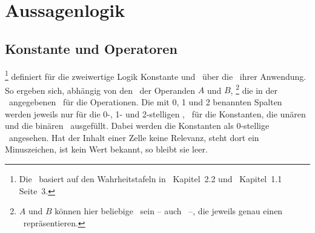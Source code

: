 \section{Aussagenlogik}%
\label{sec:Aussagenlogik}

\subsection{Konstante und Operatoren}%
\label{sub:Operatoren}

%
\footnote{%
	Die \tablename\ basiert auf den Wahrheitstafeln in~\cite{bib:Junktor} Kapitel~2.2 und~\cite{bib:Rautenberg} Kapitel~1.1 Seite~3.
}
definiert für die zweiwertige Logik Konstante und \Junktoren\ über die \Wahrheitswerte\ ihrer Anwendung.
So ergeben sich, abhängig von den \Wahrheitswerten\ der Operanden $A$ und $B$,%
\footnote{%
	$A$ und $B$ können hier beliebige \Aussagen\ sein -- auch \Formeln\ --, die jeweils genau einen \Wahrheitswert\ repräsentieren.
}
die in der \tablename\ angegebenen \Wahrheitswerte\ für die Operationen.
Die mit 0, 1 und 2 benannten Spalten werden jeweils nur für die 0-, 1- und 2-stelligen \Junktoren, \textdh\ für die Konstanten, die unären und die binären \Junktoren\ ausgefüllt.
Dabei werden die Konstanten als 0-stellige \Junktoren\ angesehen.
Hat der Inhalt einer Zelle keine Relevanz, steht dort ein Minuszeichen, ist kein Wert bekannt, so bleibt sie leer.

